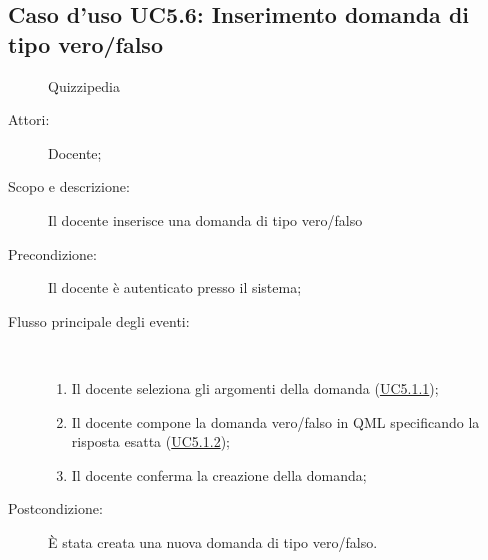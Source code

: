 \subsection{Caso d'uso UC5.6: Inserimento domanda di tipo vero/falso}
	\begin{figure}[H]
		\centering
		\begin{resizedtikzpicture}{\textwidth}
		\begin{umlsystem}[x=0, fill=lightgray!20]{Quizzipedia}
		\end{umlsystem}
		\end{resizedtikzpicture}
		\caption{}
	\end{figure}
\begin{description}
\item[Attori:] Docente;
\item[Scopo e descrizione:] Il docente inserisce una domanda di tipo vero/falso
      \item[Precondizione:] Il docente è autenticato presso il sistema;

        \item[Flusso principale degli eventi:] \ 
 \begin{enumerate}
          \item Il docente seleziona gli argomenti della domanda (\hyperlink{UC5.1.1}{UC5.1.1});
          \item Il docente compone la domanda vero/falso in QML specificando la risposta esatta (\hyperlink{UC5.1.2}{UC5.1.2});
          \item Il docente conferma la creazione della domanda;

      \end{enumerate}
    \item[Postcondizione:] È stata creata una nuova domanda di tipo vero/falso.
  \end{description}
\hypertarget{UC5.7}{}

